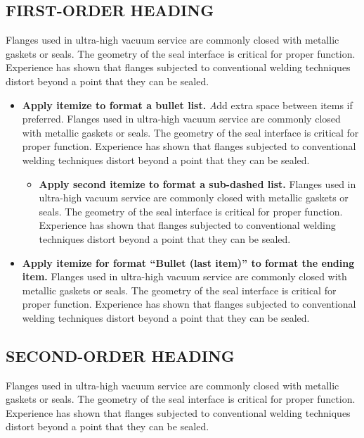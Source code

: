 \documentclass[11pt,letterpaper,twoside,english,final]{article}
\begin{document}
{\newpage
\clearemptydoublepage

\begin{center}
\section{FIRST-ORDER HEADING}
\end{center}

Flanges used in ultra-high vacuum service are commonly closed with metallic gaskets or seals. The geometry of the seal interface is critical for proper function. Experience has shown that flanges subjected to conventional welding techniques distort beyond a point that they can be sealed.
\vspace{12pt}

\begin{itemize}
\item{\bf Apply itemize to format a bullet list.} {\emph Add extra space between items if preferred.} Flanges used in ultra-high vacuum service are commonly closed with metallic gaskets or seals. The geometry of the seal interface is critical for proper function. Experience has shown that flanges subjected to conventional welding techniques distort beyond a point that they can be sealed.
\begin{itemize}
\item {\bf Apply second itemize to format a sub-dashed list.} Flanges used in ultra-high vacuum service are commonly closed with metallic gaskets or seals. The geometry of the seal interface is critical for proper function. Experience has shown that flanges subjected to conventional welding techniques distort beyond a point that they can be sealed.
\end{itemize}
\item {\bf Apply itemize for format ``Bullet (last item)'' to format the ending item.} Flanges used in ultra-high vacuum service are commonly closed with metallic gaskets or seals. The geometry of the seal interface is critical for proper function. Experience has shown that flanges subjected to conventional welding techniques distort beyond a point that they can be sealed.

\end{itemize}

\subsection{SECOND-ORDER HEADING}

Flanges used in ultra-high vacuum service are commonly closed with metallic gaskets or seals. The geometry of the seal interface is critical for proper function. Experience has shown that flanges subjected to conventional welding techniques distort beyond a point that they can be sealed.

}
\end{document}
